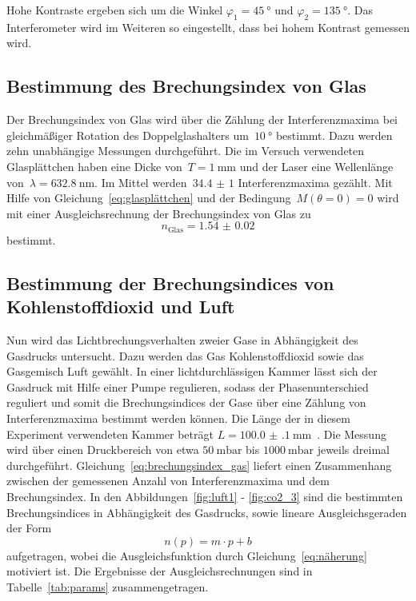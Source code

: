 Hohe Kontraste ergeben sich um die Winkel $\varphi_1=\SI{45}{\degree}$ und
$\varphi_2=\SI{135}{\degree}$. Das Interferometer wird im Weiteren so
eingestellt, dass bei hohem Kontrast gemessen wird.

\subsection{Bestimmung des Brechungsindex von Glas}
Der Brechungsindex von Glas wird über die Zählung der Interferenzmaxima bei
gleichmäßiger Rotation des Doppelglashalters um~$\SI{10}{\degree}$ bestimmt.
Dazu werden zehn unabhängige Messungen durchgeführt. Die im Versuch verwendeten
Glasplättchen haben eine Dicke von~$T=\SI{1}{\milli\meter}$ und der Laser eine
Wellenlänge von~$\lambda=\SI{632.8}{\nano\meter}$. Im Mittel
werden~$\num{34.4(10)}$ Interferenzmaxima gezählt. Mit Hilfe von
Gleichung~\eqref{eq:glasplättchen} und der Bedingung~$M(\theta=0)=0$ wird mit
einer Ausgleichsrechnung der Brechungsindex von Glas zu
\begin{equation}
  n_{\text{Glas}}=\num{1.54(2)}
  \label{eq:glas}
\end{equation}
bestimmt.

\subsection{Bestimmung der Brechungsindices von Kohlenstoffdioxid und Luft}
Nun wird das Lichtbrechungsverhalten zweier Gase in Abhängigkeit des Gasdrucks
untersucht. Dazu werden das Gas Kohlenstoffdioxid sowie das Gasgemisch Luft
gewählt. In einer lichtdurchlässigen Kammer lässt sich der Gasdruck mit Hilfe
einer Pumpe regulieren, sodass der Phasenunterschied reguliert und somit die
Brechungsindices der Gase über eine Zählung von Interferenzmaxima bestimmt
werden können. Die Länge der in diesem Experiment verwendeten Kammer beträgt
$L=\SI{100.0(1)}{\milli\meter}$~\cite{V64}. Die Messung wird über einen
Druckbereich von etwa $\SI{50}{\milli\bar}$ bis $\SI{1000}{\milli\bar}$ jeweils
dreimal durchgeführt. Gleichung~\eqref{eq:brechungsindex_gas} liefert einen
Zusammenhang zwischen der gemessenen Anzahl von Interferenzmaxima und dem
Brechungsindex. In den Abbildungen~\ref{fig:luft1} - \ref{fig:co2_3} sind
die bestimmten Brechungsindices in Abhängigkeit des Gasdrucks, sowie lineare
Ausgleichsgeraden der Form
\begin{equation}
  n(p)=m\cdot p+b
  \label{eq:linear}
\end{equation}
aufgetragen, wobei die Ausgleichsfunktion durch Gleichung~\eqref{eq:näherung}
motiviert ist. Die Ergebnisse der Ausgleichsrechnungen sind in
Tabelle~\ref{tab:params} zusammengetragen.

